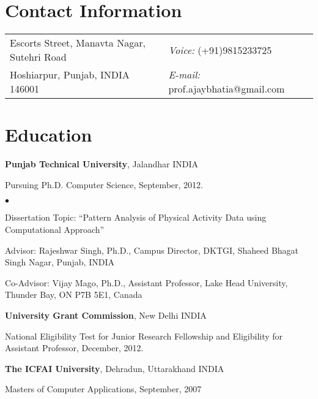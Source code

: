 \documentclass[margin,line]{res}
\newenvironment{list1}{
  \begin{list}{\ding{113}}{%
      \setlength{\itemsep}{0in}
      \setlength{\parsep}{0in} \setlength{\parskip}{0in}
      \setlength{\topsep}{0in} \setlength{\partopsep}{0in}
      \setlength{\leftmargin}{0.17in}}}{\end{list}}
\newenvironment{list2}{
  \begin{list}{$\bullet$}{%
      \setlength{\itemsep}{0in}
      \setlength{\parsep}{0in} \setlength{\parskip}{0in}
      \setlength{\topsep}{0in} \setlength{\partopsep}{0in}
      \setlength{\leftmargin}{0.2in}}}{\end{list}}
\begin{document}

\begin{resume}
\section{\sc Contact Information}
\vspace{.05in}
\begin{tabular}{@{}p{4in}p{4in}}
Escorts Street, Manavta Nagar, Sutehri Road & {\it Voice:}  (+91)9815233725\\
Hoshiarpur, Punjab, INDIA 146001 & {\it E-mail:}  prof.ajaybhatia@gmail.com\\
\end{tabular}

\section{\sc Education}
{\bf Punjab Technical University}, Jalandhar INDIA\\
\vspace*{-.1in}
\begin{list1}
\item[] Pursuing Ph.D. Computer Science, September, 2012.
\begin{list2}
\vspace*{.05in}
\item Dissertation Topic:  ``Pattern Analysis of Physical Activity Data using Computational Approach''
\item Advisor:  Rajeshwar Singh, Ph.D., Campus Director, DKTGI, Shaheed Bhagat Singh Nagar, Punjab, INDIA
\item Co-Advisor:  Vijay Mago, Ph.D., Assistant Professor, Lake Head University, Thunder Bay, ON P7B 5E1, Canada
\end{list2}
\end{list1}

{\bf University Grant Commission}, New Delhi INDIA\\
\vspace*{-.1in}
\begin{list1}
\item[] National Eligibility Test for Junior Research Fellowship and Eligibility for Assistant Professor, December, 2012.
\end{list1}

{\bf The ICFAI University}, Dehradun, Uttarakhand INDIA\\
\vspace*{-.1in}
\begin{list1}
\item[] Masters of Computer Applications,  September, 2007
\end{list1}


\end{resume}
\end{document}
